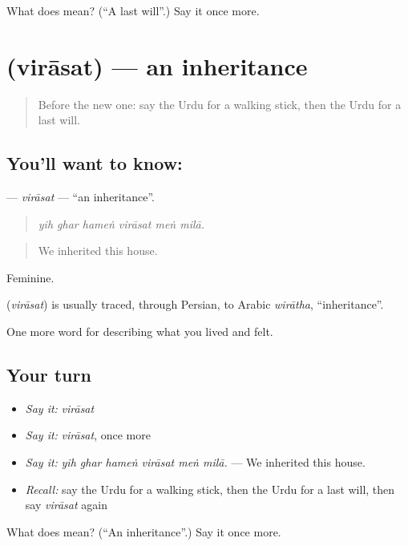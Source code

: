 \begin{tcolorbox}[breakable,colback=teal!4,colframe=teal!35!black,title={Before you move on}]
What does  mean? (\textquotedblleft{}A last will\textquotedblright{}.) Say it once more.
\end{tcolorbox}
\section[\texorpdfstring{\ur{وراثت} (virāsat)}{وراثت (virāsat)}]{ (virāsat) — an inheritance}

\label{lesson:UR-C492-virasat}



\begin{quote}
Before the new one: say the Urdu for a walking stick, then the Urdu for a last will.
\end{quote}

\subsection*{You'll want to know: }
\textbf{} — \emph{virāsat} — \textquotedblleft{}an inheritance\textquotedblright{}.

\begin{quote}
     
\end{quote}

\begin{quote}
\emph{yih ghar hameṅ virāsat meṅ milā.}
\end{quote}

\begin{quote}
We inherited this house.
\end{quote}

Feminine.

\begin{cousinweb}
\textbf{} (\emph{virāsat}) is usually traced, through Persian, to Arabic \emph{wirātha}, \textquotedblleft{}inheritance\textquotedblright{}.
\end{cousinweb}

\begin{grammarlens}[title={What you've built}]
One more word for describing what you lived and felt.
\end{grammarlens}

\subsection*{Your turn}
\begin{itemize}
\raggedright
  \item \emph{Say it:} \emph{virāsat}
  \item \emph{Say it:} \emph{virāsat}, once more
  \item \emph{Say it:} \emph{yih ghar hameṅ virāsat meṅ milā.} — We inherited this house.
  \item \emph{Recall:} say the Urdu for a walking stick, then the Urdu for a last will, then say \emph{virāsat} again
\end{itemize}

\begin{tcolorbox}[breakable,colback=teal!4,colframe=teal!35!black,title={Before you move on}]
What does  mean? (\textquotedblleft{}An inheritance\textquotedblright{}.) Say it once more.
\end{tcolorbox}
